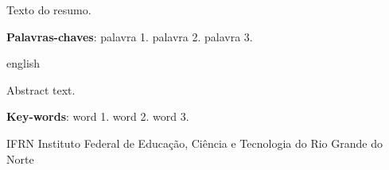 \documentclass[
    12pt,               %
    openright,          %
    oneside,            %
    a4paper,            %
    english,            %
    french,             %
    spanish,            %
    brazil              %
    ]{abntex2}
\begin{document}

\setlength{\absparsep}{18pt} %
\begin{resumo}

 Texto do resumo.
 
 \textbf{Palavras-chaves}: palavra 1. palavra 2. palavra 3.
\end{resumo}

\begin{resumo}[Abstract]
 \begin{otherlanguage*}{english}
  
  Abstract text.

   \vspace{\onelineskip}
 
   \noindent 
   \textbf{Key-words}: word 1. word 2. word 3.
 \end{otherlanguage*}
\end{resumo}

\listoffigures*
\cleardoublepage

\listoftables*
\cleardoublepage

\begin{siglas}
  \item[IFRN] Instituto Federal de Educa\c cão, Ciência e Tecnologia do Rio Grande do Norte
\end{siglas}


\tableofcontents*
\cleardoublepage



\textual
\end{document}
